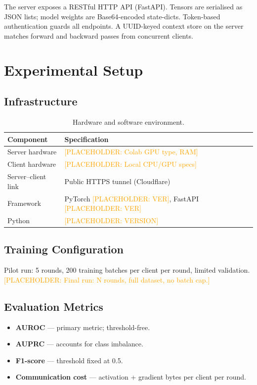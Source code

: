 \documentclass[10pt,twocolumn]{article}
\newcommand{\placeholder}[1]{\textcolor{orange}{[PLACEHOLDER: #1]}}
\begin{document}
The server exposes a RESTful HTTP API (FastAPI).  Tensors are
serialised as JSON lists; model weights are Base64-encoded state-dicts.
Token-based authentication guards all endpoints.  A UUID-keyed context
store on the server matches forward and backward passes from concurrent
clients.

\section{Experimental Setup}
\label{sec:experiments}

\subsection{Infrastructure}

\begin{table}[h]
\centering
\caption{Hardware and software environment.}
\label{tab:infra}
\begin{tabular}{ll}
\toprule
Component & Specification \\
\midrule
Server hardware   & \placeholder{Colab GPU type, RAM} \\
Client hardware   & \placeholder{Local CPU/GPU specs} \\
Server--client link & Public HTTPS tunnel (Cloudflare) \\
Framework         & PyTorch \placeholder{VER}, FastAPI \placeholder{VER} \\
Python            & \placeholder{VERSION} \\
\bottomrule
\end{tabular}
\end{table}

\subsection{Training Configuration}

Pilot run: 5 rounds, 200 training batches per client per round, limited
validation.  \placeholder{Final run: N rounds, full dataset, no batch
cap.}

\subsection{Evaluation Metrics}

\begin{itemize}[leftmargin=*]
  \item \textbf{AUROC} --- primary metric; threshold-free.
  \item \textbf{AUPRC} --- accounts for class imbalance.
  \item \textbf{F1-score} --- threshold fixed at 0.5.
  \item \textbf{Communication cost} --- activation + gradient bytes
        per client per round.
\end{itemize}
\end{document}
